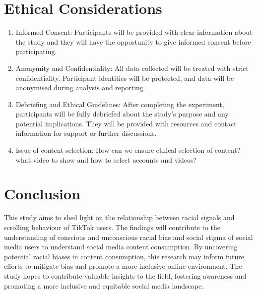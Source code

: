 \documentclass[a4paper, 12pt]{article}   %
\begin{document}
\section*{Ethical Considerations}

\begin{enumerate}
\item Informed Consent: Participants will be provided with clear information about the study and they will have the opportunity to give informed consent before participating.
\item Anonymity and Confidentiality: All data collected will be treated with strict confidentiality. Participant identities will be protected, and data will be anonymised during analysis and reporting.
\item Debriefing and Ethical Guidelines: After completing the experiment, participants will be fully debriefed about the study's purpose and any potential implications. They will be provided with resources and contact information for support or further discussions.
\item Issue of content selection: How can we ensure ethical selection of content? what video to show and how to select accounts and videos?
\end{enumerate}



\section*{Conclusion}
This study aims to shed light on the relationship between racial signals and scrolling behaviour of TikTok users. The findings will contribute to the understanding of conscious and unconscious racial bias and social stigma of social media users to understand social media content consumption.  
By uncovering potential racial biases in content consumption, this research may inform future efforts to mitigate bias and promote a more inclusive online environment. The study hopes to contribute valuable insights to the field, fostering awareness and promoting a more inclusive and equitable social media landscape.
\end{document}
